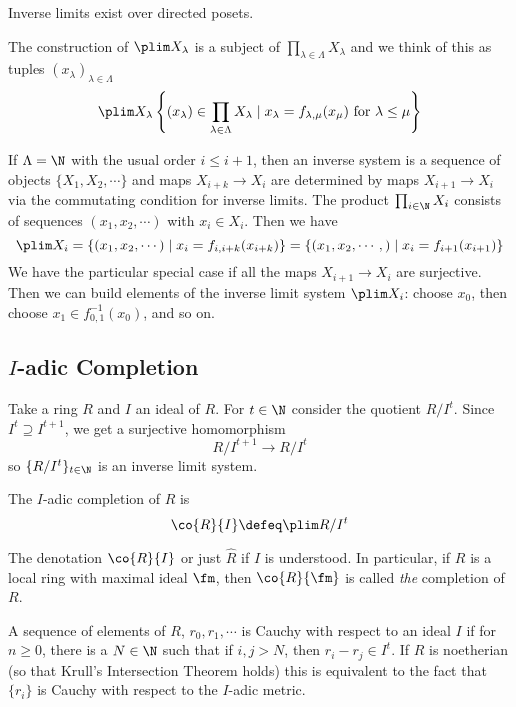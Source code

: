 \begin{thmm}
Inverse limits exist over directed posets. 
\end{thmm}

The construction of $\plim X_\lambda$ is a subject of $\prod_{\lambda \in \Lambda} X_\lambda$ and we think of this as tuples $(x_\lambda)_{\lambda \in \Lambda}$
\[
\plim X_\lambda \left\{ (x_\lambda) \in \prod_{\lambda \in \Lambda} X_\lambda \;|\;  x_\lambda=f_{\lambda, \mu}(x_\mu) \text{ for } \lambda \leq \mu \right\}
\]

\begin{ex}
If $\Lambda=\N$ with the usual order $i \leq i+1$, then an inverse system is a sequence of objects $\{X_1,X_2,\cdots\}$ and maps $X_{i+k} \to X_i$ are determined by maps $X_{i+1} \to X_i$  via the commutating condition for inverse limits. The product $\prod_{i \in \N} X_i$ consists of sequences $(x_1,x_2,\cdots)$ with $x_i \in X_i$. Then we have
\[
\plim X_i= \{(x_1,x_2,\cdots)\;|\; x_i=f_{i,i+k}(x_{i+k}) \}=\{(x_1,x_2,\cdots,)\;|\; x_i=f_{i+1}(x_{i+1})\}
\]
We have the particular special case if all the maps $X_{i+1} \to X_i$ are surjective. Then we can build elements of the inverse limit system $\plim X_i$: choose $x_0$, then choose $x_1 \in f_{0,1}^{-1}(x_0)$, and so on. 
\end{ex}

\subsection{$I$-adic Completion}

Take a ring $R$ and $I$ an ideal of $R$. For $t \in \N$ consider the quotient $R/I^t$. Since $I^t \supseteq I^{t+1}$, we get a surjective homomorphism 
\[
R/I^{t+1} \to R/I^t
\]
so $\{R/I^t\}_{t \in \N}$ is an inverse limit system. 

\begin{dfn}
The $I$-adic completion of $R$ is 
\[
\co{R}{I} \defeq \plim R/I^t
\]
\end{dfn}

The denotation $\co{R}{I}$ or just $\hat{R}$ if $I$ is understood. In particular, if $R$ is a local ring with maximal ideal $\fm$, then $\co{R}{\fm}$ is called \emph{the} completion of $R$. 

\begin{dfn}
A sequence of elements of $R$, $r_0,r_1,\cdots$ is Cauchy with respect to an ideal $I$ if for $n \geq 0$, there is a $N \in \N$ such that if $i,j >N$, then $r_i-r_j \in I^t$. If $R$ is noetherian (so that Krull's Intersection Theorem holds) this is equivalent to the fact that $\{r_i\}$ is Cauchy with respect to the $I$-adic metric. 
\end{dfn}

